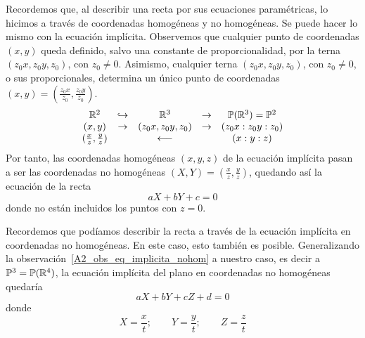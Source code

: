 \begin{obs}
	\label{A2_obs_eq_implicita_nohom}
	Recordemos que, al describir una recta por sus ecuaciones paramétricas, lo hicimos a través de coordenadas homogéneas y no homogéneas. Se puede hacer lo mismo con la ecuación implícita. Observemos que cualquier punto de coordenadas $(x,y)$ queda definido, salvo una constante de proporcionalidad, por la terna $(z_0x,z_0y,z_0)$, con $z_0\not=0$. Asimismo, cualquier terna $(z_0x,z_0y,z_0)$, con $z_0\not=0$, o sus proporcionales, determina un único punto de coordenadas $(x,y)=(\frac{z_0x}{z_0},\frac{z_0y}{z_0})$.
	\begin{equation*}
		\begin{array}{ccccc}
			\mathbb{R}^2&\hookrightarrow&\mathbb{R}^3&\rightarrow &\mathbb{P}(\mathbb{R}^3)=\mathbb{P}^2\\
			(x,y)&\rightarrow &(z_0x,z_0y,z_0)&\rightarrow &(z_0x:z_0y:z_0)\\
			(\frac{x}{z},\frac{y}{z})&&\longleftarrow &&(x:y:z)
		\end{array}
	\end{equation*}
	Por tanto, las coordenadas homogéneas $(x,y,z)$ de la ecuación implícita pasan a ser las coordenadas no homogéneas $(X,Y)=(\frac{x}{z},\frac{y}{z})$, quedando así la ecuación de la recta
	\begin{equation}
		\label{A2_eq_implicita_nohom}
		aX+bY+c=0
	\end{equation}
	donde no están incluidos los puntos con $z=0$.\\
\end{obs}

\begin{obs}
	Recordemos que podíamos describir la recta a través de la ecuación implícita en coordenadas no homogéneas. En este caso, esto también es posible. Generalizando la observación~\ref{A2_obs_eq_implicita_nohom} a nuestro caso, es decir a $\mathbb{P}^3=\mathbb{P}(\mathbb{R}^4)$, la ecuación implícita del plano en coordenadas no homogéneas quedaría
	\begin{equation}
		\label{A2_eq_implicita_plano_nohom}
		aX+bY+cZ+d=0
	\end{equation}
	donde 
	\begin{equation*}
		X=\frac{x}{t};\qquad Y=\frac{y}{t};\qquad Z=\frac{z}{t}
	\end{equation*}\\
\end{obs}
